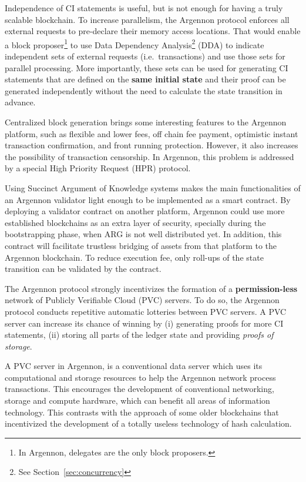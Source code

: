 Independence of CI statements is useful, but is not enough for having a truly scalable blockchain. To increase
parallelism, the Argennon protocol enforces all external requests to pre-declare their memory access locations. That
would enable a block proposer\footnote{In Argennon, delegates are the only block proposers.} to use Data Dependency
Analysis\footnote{See Section~\ref{sec:concurrency}} (DDA) to indicate independent sets of external requests (i.e.\
transactions) and use those sets for parallel processing. More importantly, these sets can be used for generating CI
statements that are defined on the \textbf{same initial state} and their proof can be generated independently without
the need to calculate the state transition in advance.

Centralized block generation brings some interesting features to the Argennon platform, such as flexible and lower
fees, off chain fee payment, optimistic instant transaction confirmation, and front running protection.
However, it also increases the possibility of transaction censorship. In Argennon, this problem is addressed by a
special High Priority Request (HPR) protocol.

Using Succinct Argument of Knowledge systems makes the main functionalities of an Argennon validator light enough to
be implemented as a smart contract. By deploying a validator contract on another platform, Argennon
could use more established blockchains as an extra layer of security, specially
during the bootstrapping phase, when ARG is not well distributed yet. In addition, this contract will facilitate
trustless bridging of assets from that platform to the Argennon blockchain. To reduce execution fee, only
roll-ups of the state transition can be validated by the contract.

The Argennon protocol strongly incentivizes the formation of a \textbf{permission-less} network of Publicly Verifiable
Cloud (PVC) servers. To do so, the Argennon protocol conducts repetitive automatic lotteries between PVC servers.
A PVC server can increase its chance of winning by (i) generating proofs for more CI statements, (ii) storing all
parts of the ledger state and providing \emph{proofs of storage}.

A PVC server in Argennon, is a conventional data server which uses its computational and
storage resources to help the Argennon network process transactions. This encourages the development
of conventional networking, storage and compute hardware, which can benefit all areas of information technology.
This contrasts with the approach of some older blockchains that incentivized the development of a totally
useless technology of hash calculation.
